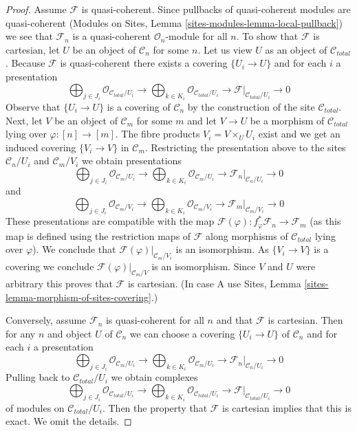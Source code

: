 \begin{proof}
Assume $\mathcal{F}$ is quasi-coherent. Since pullbacks of
quasi-coherent modules are quasi-coherent
(Modules on Sites, Lemma \ref{sites-modules-lemma-local-pullback})
we see that $\mathcal{F}_n$ is a quasi-coherent $\mathcal{O}_n$-module
for all $n$. To show that $\mathcal{F}$ is cartesian, let $U$
be an object of $\mathcal{C}_n$ for some $n$. Let us view $U$
as an object of $\mathcal{C}_{total}$. Because $\mathcal{F}$
is quasi-coherent there exists a covering $\{U_i \to U\}$
and for each $i$ a presentation
$$
\bigoplus\nolimits_{j \in J_i} \mathcal{O}_{\mathcal{C}_{total}/U_i} \to
\bigoplus\nolimits_{k \in K_i} \mathcal{O}_{\mathcal{C}_{total}/U_i} \to
\mathcal{F}|_{\mathcal{C}_{total}/U_i} \to 0
$$
Observe that $\{U_i \to U\}$ is a covering of $\mathcal{C}_n$ by
the construction of the site $\mathcal{C}_{total}$.
Next, let $V$ be an object of $\mathcal{C}_m$ for some $m$ and let
$V \to U$ be a morphism of $\mathcal{C}_{total}$ lying over
$\varphi : [n] \to [m]$. The fibre products $V_i = V \times_U U_i$
exist and we get an induced covering $\{V_i \to V\}$ in $\mathcal{C}_m$.
Restricting the presentation above to the sites
$\mathcal{C}_n/U_i$ and $\mathcal{C}_m/V_i$ we obtain
presentations
$$
\bigoplus\nolimits_{j \in J_i} \mathcal{O}_{\mathcal{C}_m/U_i} \to
\bigoplus\nolimits_{k \in K_i} \mathcal{O}_{\mathcal{C}_m/U_i} \to
\mathcal{F}_n|_{\mathcal{C}_n/U_i} \to 0
$$
and
$$
\bigoplus\nolimits_{j \in J_i} \mathcal{O}_{\mathcal{C}_m/V_i} \to
\bigoplus\nolimits_{k \in K_i} \mathcal{O}_{\mathcal{C}_m/V_i} \to
\mathcal{F}_m|_{\mathcal{C}_m/V_i} \to 0
$$
These presentations are compatible with the map
$\mathcal{F}(\varphi) : f_\varphi^*\mathcal{F}_n \to \mathcal{F}_m$
(as this map is defined using the restriction maps of $\mathcal{F}$
along morphisms of $\mathcal{C}_{total}$ lying over $\varphi$).
We conclude that $\mathcal{F}(\varphi)|_{\mathcal{C}_m/V_i}$
is an isomorphism. As $\{V_i \to V\}$ is a covering we conclude
$\mathcal{F}(\varphi)|_{\mathcal{C}_m/V}$ is an isomorphism.
Since $V$ and $U$ were arbitrary this proves that $\mathcal{F}$ is cartesian.
(In case A use Sites, Lemma \ref{sites-lemma-morphism-of-sites-covering}.)

\medskip\noindent
Conversely, assume $\mathcal{F}_n$ is quasi-coherent
for all $n$ and that $\mathcal{F}$ is cartesian.
Then for any $n$ and object $U$ of $\mathcal{C}_n$ we
can choose a covering $\{U_i \to U\}$ of $\mathcal{C}_n$
and for each $i$ a presentation
$$
\bigoplus\nolimits_{j \in J_i} \mathcal{O}_{\mathcal{C}_m/U_i} \to
\bigoplus\nolimits_{k \in K_i} \mathcal{O}_{\mathcal{C}_m/U_i} \to
\mathcal{F}_n|_{\mathcal{C}_n/U_i} \to 0
$$
Pulling back to $\mathcal{C}_{total}/U_i$ we obtain complexes
$$
\bigoplus\nolimits_{j \in J_i} \mathcal{O}_{\mathcal{C}_{total}/U_i} \to
\bigoplus\nolimits_{k \in K_i} \mathcal{O}_{\mathcal{C}_{total}/U_i} \to
\mathcal{F}|_{\mathcal{C}_{total}/U_i} \to 0
$$
of modules on $\mathcal{C}_{total}/U_i$. Then the property that
$\mathcal{F}$ is cartesian implies that this is exact.
We omit the details.
\end{proof}






